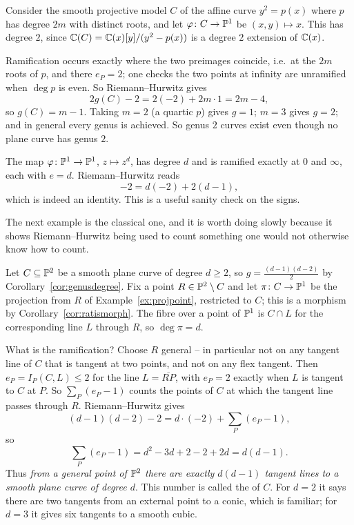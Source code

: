 \documentclass[a4paper]{scrartcl}
\begin{document}
\begin{example}\label{ex:hyperelliptic}
	Consider the smooth projective model $C$ of the affine curve $y^2 = p(x)$ where $p$ has degree $2m$ with distinct roots, and let $\varphi \colon C \to \mathbb{P}^1$ be $(x,y)\mapsto x$. This has degree $2$, since $\mathbb{C}(C) = \mathbb{C}(x)[y]/(y^2-p(x))$ is a degree $2$ extension of $\mathbb{C}(x)$.

	Ramification occurs exactly where the two preimages coincide, i.e.\ at the $2m$ roots of $p$, and there $e_P = 2$; one checks the two points at infinity are unramified when $\deg p$ is even. So Riemann--Hurwitz gives
	$$2g(C)-2 = 2(-2) + 2m\cdot 1 = 2m-4,$$
	so $g(C) = m-1$. Taking $m = 2$ (a quartic $p$) gives $g = 1$; $m = 3$ gives $g = 2$; and in general every genus is achieved. So genus $2$ curves exist even though no plane curve has genus $2$.
\end{example}

\begin{example}
	The map $\varphi \colon \mathbb{P}^1\to\mathbb{P}^1$, $z \mapsto z^d$, has degree $d$ and is ramified exactly at $0$ and $\infty$, each with $e = d$. Riemann--Hurwitz reads
	$$-2 = d(-2) + 2(d-1),$$
	which is indeed an identity. This is a useful sanity check on the signs.
\end{example}

The next example is the classical one, and it is worth doing slowly because it shows Riemann--Hurwitz being used to count something one would not otherwise know how to count.

\begin{example}\label{ex:class}
	Let $C \subseteq \mathbb{P}^2$ be a smooth plane curve of degree $d \geq 2$, so $g = \frac{(d-1)(d-2)}{2}$ by Corollary~\ref{cor:genusdegree}. Fix a point $R \in \mathbb{P}^2\setminus C$ and let $\pi \colon C \to \mathbb{P}^1$ be the projection from $R$ of Example~\ref{ex:projpoint}, restricted to $C$; this is a morphism by Corollary~\ref{cor:ratismorph}. The fibre over a point of $\mathbb{P}^1$ is $C \cap L$ for the corresponding line $L$ through $R$, so $\deg\pi = d$.

	What is the ramification? Choose $R$ general -- in particular not on any tangent line of $C$ that is tangent at two points, and not on any flex tangent. Then $e_P = I_P(C,L) \leq 2$ for the line $L = \overline{RP}$, with $e_P = 2$ exactly when $L$ is tangent to $C$ at $P$. So $\sum_P(e_P-1)$ counts the points of $C$ at which the tangent line passes through $R$. Riemann--Hurwitz gives
	$$(d-1)(d-2) - 2 = d\cdot(-2) + \sum_{P}(e_P-1),$$
	so
	$$\sum_P (e_P - 1) = d^2 - 3d + 2 - 2 + 2d = d(d-1).$$
	Thus \emph{from a general point of $\mathbb{P}^2$ there are exactly $d(d-1)$ tangent lines to a smooth plane curve of degree $d$}. This number is called the  of $C$. For $d = 2$ it says there are two tangents from an external point to a conic, which is familiar; for $d = 3$ it gives six tangents to a smooth cubic.
\end{example}
\end{document}
